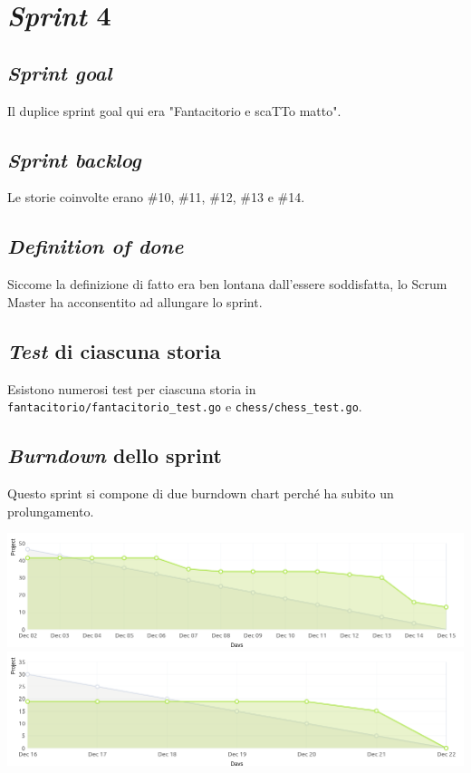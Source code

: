 \documentclass{article}
\begin{document}
\section{\emph{Sprint} 4}

\subsection{\emph{Sprint goal}}

Il duplice sprint goal qui era "Fantacitorio e scaTTo matto".

\subsection{\emph{Sprint backlog}}

Le storie coinvolte erano \#10, \#11, \#12, \#13 e \#14.

\subsection{\emph{Definition of done}}

Siccome la definizione di fatto era ben lontana dall'essere soddisfatta, lo
Scrum Master ha acconsentito ad allungare lo sprint.

\subsection{\emph{Test} di ciascuna storia}

Esistono numerosi test per ciascuna storia in
\verb!fantacitorio/fantacitorio_test.go! e \verb!chess/chess_test.go!.

\subsection{\emph{Burndown} dello sprint}

Questo sprint si compone di due burndown chart perché ha subito un
prolungamento.

\includegraphics[width=\textwidth]{burndown-4-0.png}
\includegraphics[width=\textwidth]{burndown-4-1.png}
\end{document}
